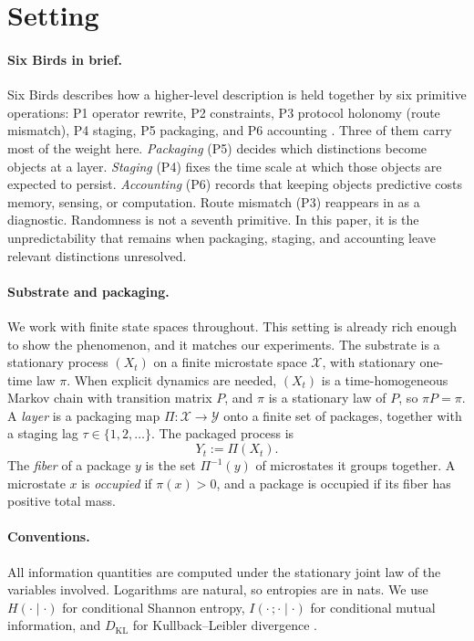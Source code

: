 \section{Setting}\label{sec:setup}

\paragraph{Six Birds in brief.} Six Birds describes how a higher-level description is held together by six primitive operations: P1 operator rewrite, P2 constraints, P3 protocol holonomy (route mismatch), P4 staging, P5 packaging, and P6 accounting \citep{tsiokos2026sixbirds}. Three of them carry most of the weight here. \emph{Packaging} (P5) decides which distinctions become objects at a layer. \emph{Staging} (P4) fixes the time scale at which those objects are expected to persist. \emph{Accounting} (P6) records that keeping objects predictive costs memory, sensing, or computation. Route mismatch (P3) reappears in  as a diagnostic. Randomness is not a seventh primitive. In this paper, it is the unpredictability that remains when packaging, staging, and accounting leave relevant distinctions unresolved.

\paragraph{Substrate and packaging.} We work with finite state spaces throughout. This setting is already rich enough to show the phenomenon, and it matches our experiments. The substrate is a stationary process $(X_t)$ on a finite microstate space $\mathcal{X}$, with stationary one-time law $\pi$. When explicit dynamics are needed, $(X_t)$ is a time-homogeneous Markov chain with transition matrix $P$, and $\pi$ is a stationary law of $P$, so $\pi P=\pi$. A \emph{layer} is a packaging map $\Pi:\mathcal{X}\to\mathcal{Y}$ onto a finite set of packages, together with a staging lag $\tau\in\{1,2,\dots\}$. The packaged process is
\begin{equation}
Y_t := \Pi(X_t).
\label{eq:packaged-process}
\end{equation}
The \emph{fiber} of a package $y$ is the set $\Pi^{-1}(y)$ of microstates it groups together. A microstate $x$ is \emph{occupied} if $\pi(x)>0$, and a package is occupied if its fiber has positive total mass.

\paragraph{Conventions.} All information quantities are computed under the stationary joint law of the variables involved. Logarithms are natural, so entropies are in nats. We use $H(\cdot\mid\cdot)$ for conditional Shannon entropy, $I(\cdot\,;\cdot\mid\cdot)$ for conditional mutual information, and $D_{\mathrm{KL}}$ for Kullback--Leibler divergence \citep{cover2006elementsofinformationtheory}.


